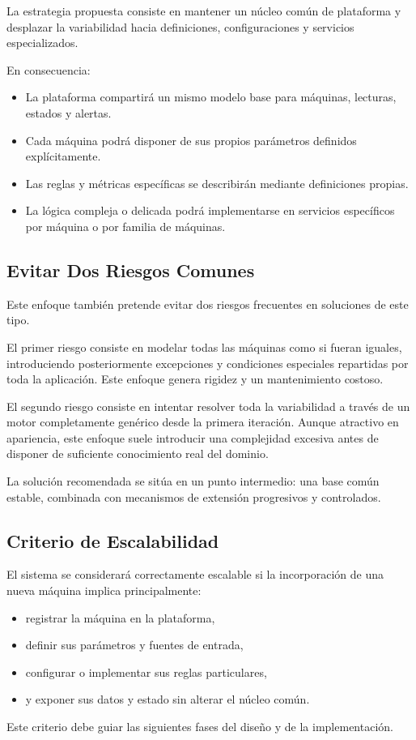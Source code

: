 La estrategia propuesta consiste en mantener un núcleo común de plataforma y desplazar la variabilidad hacia definiciones, configuraciones y servicios especializados.

En consecuencia:

\begin{itemize}
    \item La plataforma compartirá un mismo modelo base para máquinas, lecturas, estados y alertas.
    \item Cada máquina podrá disponer de sus propios parámetros definidos explícitamente.
    \item Las reglas y métricas específicas se describirán mediante definiciones propias.
    \item La lógica compleja o delicada podrá implementarse en servicios específicos por máquina o por familia de máquinas.
\end{itemize}

\subsection{Evitar Dos Riesgos Comunes}

Este enfoque también pretende evitar dos riesgos frecuentes en soluciones de este tipo.

El primer riesgo consiste en modelar todas las máquinas como si fueran iguales, introduciendo posteriormente excepciones y condiciones especiales repartidas por toda la aplicación. Este enfoque genera rigidez y un mantenimiento costoso.

El segundo riesgo consiste en intentar resolver toda la variabilidad a través de un motor completamente genérico desde la primera iteración. Aunque atractivo en apariencia, este enfoque suele introducir una complejidad excesiva antes de disponer de suficiente conocimiento real del dominio.

La solución recomendada se sitúa en un punto intermedio: una base común estable, combinada con mecanismos de extensión progresivos y controlados.

\subsection{Criterio de Escalabilidad}

El sistema se considerará correctamente escalable si la incorporación de una nueva máquina implica principalmente:

\begin{itemize}
    \item registrar la máquina en la plataforma,
    \item definir sus parámetros y fuentes de entrada,
    \item configurar o implementar sus reglas particulares,
    \item y exponer sus datos y estado sin alterar el núcleo común.
\end{itemize}

Este criterio debe guiar las siguientes fases del diseño y de la implementación.